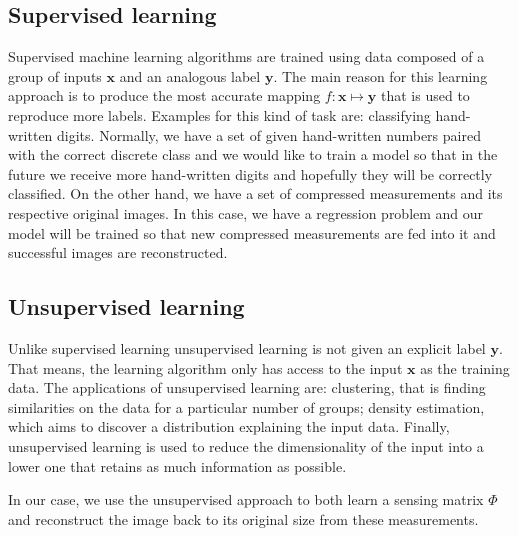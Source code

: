 \subsection{Supervised learning} \label{sec:superv}
Supervised machine learning algorithms are trained using data composed of a group of inputs $\mathbf{x}$ and an analogous label $\mathbf{y}$. The main reason for this learning approach is to produce the most accurate mapping $f : \mathbf{x} \mapsto \mathbf{y} $ that is used to reproduce more labels. Examples for this kind of task are: classifying hand-written digits. Normally, we have a set of given hand-written numbers paired with the correct discrete class and we would like to train a model so that in the future we receive more hand-written digits and hopefully they will be correctly classified. On the other hand, we have a set of compressed measurements and its respective original images. In this case, we have a regression problem and our model will be trained so that new compressed measurements are fed into it and successful images are reconstructed.  

\FloatBarrier 

\subsection{Unsupervised learning} \label{sec:unsuperv}
Unlike supervised learning unsupervised learning is not given an explicit label $\mathbf{y}$. That means, the learning algorithm only has access to the input  $\mathbf{x}$ as the training data. The applications of unsupervised learning are: clustering, that is finding similarities on the data for a particular number of groups; density estimation, which aims to discover a distribution explaining the input data. Finally, unsupervised learning is used to reduce the dimensionality of the input into a lower one that retains as much information as possible. \

In our case, we use the unsupervised approach to both learn a sensing matrix $\Phi$ and  reconstruct the image back to its original size from these measurements. 

\FloatBarrier
        
